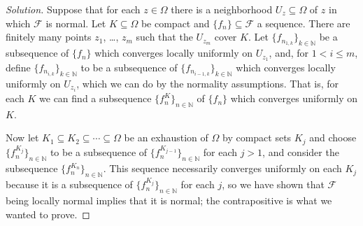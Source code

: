 \documentclass[10pt]{article}
\providecommand{\NN}{\mathbb N}
\newenvironment{soln}{\begin{proof}[Solution]}{\end{proof}}
\begin{document}
\begin{soln}
    Suppose that for each $z\in\Omega$ there is
    a neighborhood $U_z\subseteq \Omega$ of $z$
    in which $\mathcal F$ is normal.
    Let $K\subseteq\Omega$ be compact
    and $\{f_n\}\subseteq\mathcal F$ a sequence.
    There are finitely many points $z_1$, \dots, $z_m$
    such that the $U_{z_m}$ cover $K$.
    Let $\{f_{n_{1,k}}\}_{k\in\NN}$ be a subsequence of $\{f_n\}$
    which converges locally uniformly on $U_{z_1}$,
    and, for $1 < i \le m$, define $\{f_{n_{i,k}}\}_{k\in\NN}$
    to be a subsequence of $\{f_{n_{i-1,k}}\}_{k\in\NN}$
    which converges locally uniformly on $U_{z_i}$,
    which we can do by the normality assumptions.
    That is, for each $K$ we can find a subsequence
    $\{f^K_n\}_{n\in\NN}$ of $\{f_n\}$ which converges uniformly on $K$.

    Now let $K_1\subseteq K_2\subseteq\cdots\subseteq\Omega$
    be an exhaustion of $\Omega$ by compact sets $K_j$
    and choose $\{f^{K_j}_n\}_{n\in\NN}$
    to be a subsequence of $\{f^{K_{j-1}}_n\}_{n\in\NN}$ for each $j > 1$,
    and consider the subsequence $\{f^{K_n}_n\}_{n\in\NN}$.
    This sequence necessarily converges uniformly on each $K_j$
    because it is a subsequence of $\{f^{K_j}_n\}_{n\in\NN}$
    for each $j$, so we have shown that $\mathcal F$ being
    locally normal implies that it is normal;
    the contrapositive is what we wanted to prove.
\end{soln}
\end{document}
